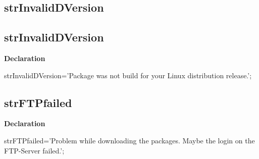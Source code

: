 \documentclass{report}
\newif\ifpdf
\begin{document}
\subsection*{\large{\textbf{strInvalidDVersion}}\normalsize\hspace{1ex}\hrulefill}
\else
\subsection*{strInvalidDVersion}
\fi
\label{trstrings-strInvalidDVersion}
\begin{list}{}{
\setlength{\itemindent}{0cm}
\setlength{\listparindent}{0cm}
\setlength{\leftmargin}{\evensidemargin}
\addtolength{\leftmargin}{\tmplength}
\settowidth{\labelsep}{X}
\addtolength{\leftmargin}{\labelsep}
\setlength{\labelwidth}{\tmplength}
}
\item[\textbf{Declaration}\hfill]
\ifpdf
\begin{flushleft}
\fi
\begin{ttfamily}
strInvalidDVersion='Package was not build for your Linux distribution release.';\end{ttfamily}

\ifpdf
\end{flushleft}
\fi

\end{list}
\ifpdf
\subsection*{\large{\textbf{strFTPfailed}}\normalsize\hspace{1ex}\hrulefill}
\else
\subsection*{strFTPfailed}
\fi
\label{trstrings-strFTPfailed}
\begin{list}{}{
\setlength{\itemindent}{0cm}
\setlength{\listparindent}{0cm}
\setlength{\leftmargin}{\evensidemargin}
\addtolength{\leftmargin}{\tmplength}
\settowidth{\labelsep}{X}
\addtolength{\leftmargin}{\labelsep}
\setlength{\labelwidth}{\tmplength}
}
\item[\textbf{Declaration}\hfill]
\ifpdf
\begin{flushleft}
\fi
\begin{ttfamily}
strFTPfailed='Problem while downloading the packages. Maybe the login on the FTP-Server failed.';\end{ttfamily}

\ifpdf
\end{flushleft}
\fi

\end{list}
\ifpdf
\end{document}
